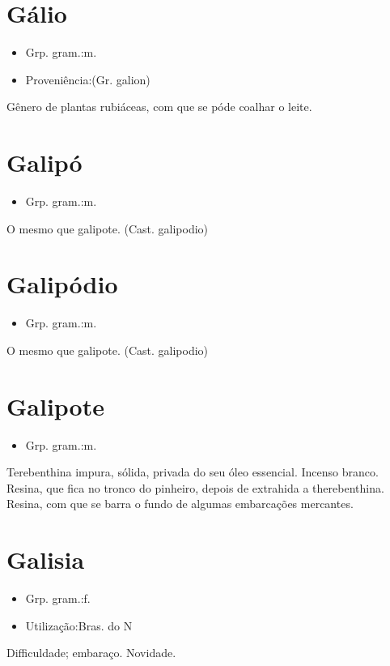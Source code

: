 \section{Gálio}
\begin{itemize}
\item {Grp. gram.:m.}
\end{itemize}
\begin{itemize}
\item {Proveniência:(Gr. \textunderscore galion\textunderscore )}
\end{itemize}
Gênero de plantas rubiáceas, com que se póde coalhar o leite.
\section{Galipó}
\begin{itemize}
\item {Grp. gram.:m.}
\end{itemize}
O mesmo que \textunderscore galipote\textunderscore .
(Cast. \textunderscore galipodio\textunderscore )
\section{Galipódio}
\begin{itemize}
\item {Grp. gram.:m.}
\end{itemize}
O mesmo que \textunderscore galipote\textunderscore .
(Cast. \textunderscore galipodio\textunderscore )
\section{Galipote}
\begin{itemize}
\item {Grp. gram.:m.}
\end{itemize}
Terebenthina impura, sólida, privada do seu óleo essencial.
Incenso branco.
Resina, que fica no tronco do pinheiro, depois de extrahida a therebenthina.
Resina, com que se barra o fundo de algumas embarcações mercantes.
\section{Galisia}
\begin{itemize}
\item {Grp. gram.:f.}
\end{itemize}
\begin{itemize}
\item {Utilização:Bras. do N}
\end{itemize}
Difficuldade; embaraço.
Novidade.
